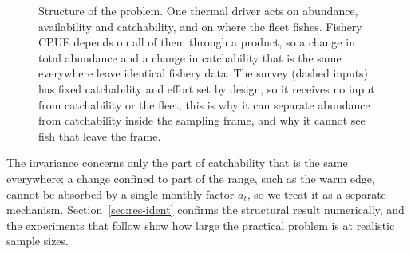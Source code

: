 \documentclass[11pt,a4paper]{article}
\begin{document}
\begin{figure}[tb]
\centering
{}
\caption{Structure of the problem. One thermal driver acts on abundance, availability and catchability, and on where the fleet fishes. Fishery CPUE depends on all of them through a product, so a change in total abundance and a change in catchability that is the same everywhere leave identical fishery data. The survey (dashed inputs) has fixed catchability and effort set by design, so it receives no input from catchability or the fleet; this is why it can separate abundance from catchability inside the sampling frame, and why it cannot see fish that leave the frame.}
\label{fig:schematic}
\end{figure}

The invariance concerns only the part of catchability that is the same everywhere; a change confined to part of the range, such as the warm edge, cannot be absorbed by a single monthly factor $a_t$, so we treat it as a separate mechanism. Section~\ref{sec:res-ident} confirms the structural result numerically, and the experiments that follow show how large the practical problem is at realistic sample sizes.
\end{document}
